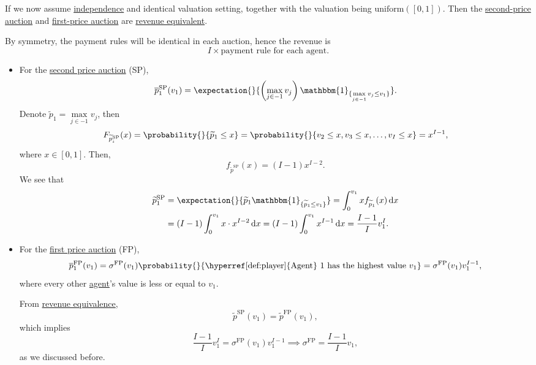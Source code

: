If we now assume \hyperref[def:independent]{independence} and identical valuation setting, together with the valuation being
\(\mathrm{uniform}([0,1])\). Then the \hyperref[eg:second-price-auction]{second-price auction} and \hyperref[eg:first-price-auction]{first-price auction}
are \hyperref[rmk:revenue-equivalence]{revenue equivalent}.

By symmetry, the payment rules will be identical in each auction, hence the revenue is
\[
	I\times \text{payment rule for each agent}.
\]

\begin{itemize}
	\item For the \hyperref[eg:second-price-auction]{second price auction} (SP),
	      \[
		      \overline{p}_1^{\mathrm{SP}}(v_1) = \expectation{}{\left(\max_{j\in -1}v_{j}\right)\mathbbm{1}_{\{ \max\limits_{j\in -1} v_{j}\leq v_1\}} }.
	      \]
	      Denote \(\widetilde{p}_1 = \max\limits_{j\in -1} v_{j}\), then
	      \[
		      F_{\widetilde{p}^{\mathrm{SP}}_i}(x) = \probability{}{\widetilde{p}_1\leq x} = \probability{}{v_2\leq x, v_3\leq x, \ldots , v_I\leq x} = x^{I-1},
	      \]
	      where \(x\in [0, 1]\). Then,
	      \[
		      f_{\widetilde{p}^{\mathrm{SP}}}(x) = (I - 1)x^{I-2}.
	      \]
	      We see that
	      \[
		      \begin{split}
			      \widetilde{p}_1^{\mathrm{SP}} &= \expectation{}{\widetilde{p}_{1}\mathbbm{1}_{\{ \widetilde{p}_1\leq v_1 \}} }
			      =\int_0^{v_1} xf_{\widetilde{p}_1}(x)\,\mathrm{d}x\\
			      &= (I - 1)\int_0^{v_1}x\cdot x^{I-2}\,\mathrm{d}x
			      = (I - 1)\int_0^{v_1}x^{I-1}\,\mathrm{d}x
			      = \frac{I-1}{I}v_1^I.
		      \end{split}
	      \]
	\item For the \hyperref[eg:first-price-auction]{first price auction} (FP),
	      \[
		      \overline{p}_1^{\mathrm{FP}}(v_1)
		      = \sigma^{\mathrm{FP}}(v_1)\probability{}{\text{\hyperref[def:player]{Agent} 1 has the highest value \(v_1\)}}
		      = \sigma^{\mathrm{FP}}(v_1)v_1^{I-1},
	      \]
	      where every other \hyperref[def:player]{agent}'s value is less or equal to \(v_1\).

	      From \hyperref[rmk:revenue-equivalence]{revenue equivalence},
	      \[
		      \widetilde{p}^{\mathrm{SP}}(v_1) = \widetilde{p}^{\mathrm{FP}}(v_1),
	      \]
	      which implies
	      \[
		      \frac{I-1}{I}v_{1}^I = \sigma^{\mathrm{FP}}(v_1)v_1^{I-1} \implies \sigma^{\mathrm{FP}} = \frac{I-1}{I}v_1,
	      \]
	      as we discussed before.
\end{itemize}

